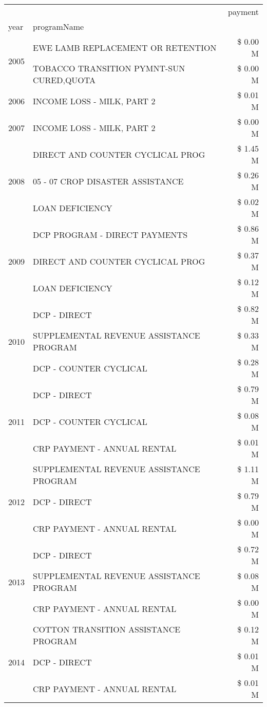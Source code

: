 \begin{tabular}{llr}
\toprule
 &  & payment \\
year & programName &  \\
\midrule
\multirow[t]{2}{*}{2005} & EWE LAMB REPLACEMENT OR RETENTION & \$ 0.00 M \\
 & TOBACCO TRANSITION PYMNT-SUN CURED,QUOTA & \$ 0.00 M \\
\cline{1-3}
2006 & INCOME LOSS - MILK, PART 2 & \$ 0.01 M \\
\cline{1-3}
2007 & INCOME LOSS - MILK, PART 2 & \$ 0.00 M \\
\cline{1-3}
\multirow[t]{3}{*}{2008} & DIRECT AND COUNTER CYCLICAL PROG & \$ 1.45 M \\
 & 05 - 07 CROP DISASTER ASSISTANCE & \$ 0.26 M \\
 & LOAN DEFICIENCY & \$ 0.02 M \\
\cline{1-3}
\multirow[t]{3}{*}{2009} & DCP PROGRAM - DIRECT PAYMENTS & \$ 0.86 M \\
 & DIRECT AND COUNTER CYCLICAL PROG & \$ 0.37 M \\
 & LOAN DEFICIENCY & \$ 0.12 M \\
\cline{1-3}
\multirow[t]{3}{*}{2010} & DCP - DIRECT & \$ 0.82 M \\
 & SUPPLEMENTAL REVENUE ASSISTANCE PROGRAM & \$ 0.33 M \\
 & DCP - COUNTER CYCLICAL & \$ 0.28 M \\
\cline{1-3}
\multirow[t]{3}{*}{2011} & DCP - DIRECT & \$ 0.79 M \\
 & DCP - COUNTER CYCLICAL & \$ 0.08 M \\
 & CRP PAYMENT - ANNUAL RENTAL & \$ 0.01 M \\
\cline{1-3}
\multirow[t]{3}{*}{2012} & SUPPLEMENTAL REVENUE ASSISTANCE PROGRAM & \$ 1.11 M \\
 & DCP - DIRECT & \$ 0.79 M \\
 & CRP PAYMENT - ANNUAL RENTAL & \$ 0.00 M \\
\cline{1-3}
\multirow[t]{3}{*}{2013} & DCP - DIRECT & \$ 0.72 M \\
 & SUPPLEMENTAL REVENUE ASSISTANCE PROGRAM & \$ 0.08 M \\
 & CRP PAYMENT - ANNUAL RENTAL & \$ 0.00 M \\
\cline{1-3}
\multirow[t]{3}{*}{2014} & COTTON TRANSITION ASSISTANCE PROGRAM & \$ 0.12 M \\
 & DCP - DIRECT & \$ 0.01 M \\
 & CRP PAYMENT - ANNUAL RENTAL & \$ 0.01 M \\

\end{tabular}
